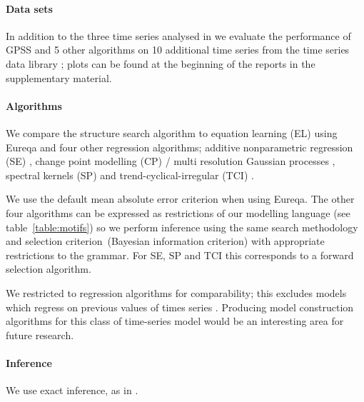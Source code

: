 \documentclass{article}
\begin{document}
\paragraph{Data sets}

In addition to the three time series analysed in \cite{DuvLloGroetal13} we evaluate the performance of GPSS and 5 other algorithms on 10 additional time series from the time series data library \citep{TSDL}; plots can be found at the beginning of the reports in the supplementary material.

\paragraph{Algorithms}

We compare the structure search algorithm to equation learning (EL) using Eureqa \citep{Eureqa} and four other regression algorithms; additive nonparametric regression (SE) \citep[e.g.][]{buja1989linear}, change point modelling (CP) / multi resolution Gaussian processes \citep[e.g.][]{garnett2010sequential, FoxDunson:NIPS2012}, spectral kernels (SP) \citep{WilAda13} and trend-cyclical-irregular (TCI) \citep[e.g.][]{lind2006basic}.

We use the default mean absolute error criterion when using Eureqa.
The other four algorithms can be expressed as restrictions of our modelling language (see table~\ref{table:motifs}) so we perform inference using the same search methodology and selection criterion\footnotemark~(Bayesian information criterion) with appropriate restrictions to the grammar.
For SE, SP and TCI this corresponds to a forward selection algorithm.

We restricted to regression algorithms for comparability; this excludes models which regress on previous values of times series \citep[e.g.][]{box2013time}.
Producing model construction algorithms for this class of time-series model would be an interesting area for future research.

\paragraph{Inference}

We use exact inference, as in \cite{DuvLloGroetal13}.
\end{document}
